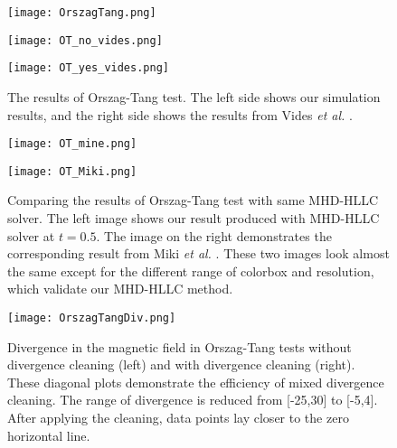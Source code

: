 \begin{figure}[htbp]
\centering
\begin{minipage}[OrszagTang_mine]{0.45\textwidth}
  \texttt{[image: OrszagTang.png]}
\end{minipage}
\begin{minipage}[OrszagTang_noDC_vides]{0.235\textwidth}
  \texttt{[image: OT\_no\_vides.png]}
\end{minipage}
\begin{minipage}[OrszagTang_yesDC_vides]{0.235\textwidth}
  \texttt{[image: OT\_yes\_vides.png]}
\end{minipage}
\caption[OrszagTang test]{The results of Orszag-Tang test. The left side shows our simulation results, and the right side shows the results from Vides \textit{et al.} \cite{vides2013divergence}.}
\label{fig:OT}
\end{figure}

\begin{figure}[htbp]
    \centering
    \begin{minipage}{0.45\textwidth}
  \texttt{[image: OT\_mine.png]}
\end{minipage}
\begin{minipage}{0.43\textwidth}
  \texttt{[image: OT\_Miki.png]}
\end{minipage}
    \caption[Orszag-Tang with HLLC method]{Comparing the results of Orszag-Tang test with same MHD-HLLC solver. The left image shows our result produced with MHD-HLLC solver at $t=0.5$. The image on the right demonstrates the corresponding result from Miki \textit{et al.} \cite{miki2007large}. These two images look almost the same except for the different range of colorbox and resolution, which validate our MHD-HLLC method.}
    \label{fig:OTComparing}
\end{figure}

\begin{figure}[htbp]
    \centering
\texttt{[image: OrszagTangDiv.png]}
    \caption[Divergence in OrszagTang]{Divergence in the magnetic field in Orszag-Tang tests without divergence cleaning (left) and with divergence cleaning (right). These diagonal plots demonstrate the efficiency of mixed divergence cleaning. The range of divergence is reduced from [-25,30] to [-5,4]. After applying the cleaning, data points lay closer to the zero horizontal line.}
    \label{fig13:OrszagtangDiv}
\end{figure}


